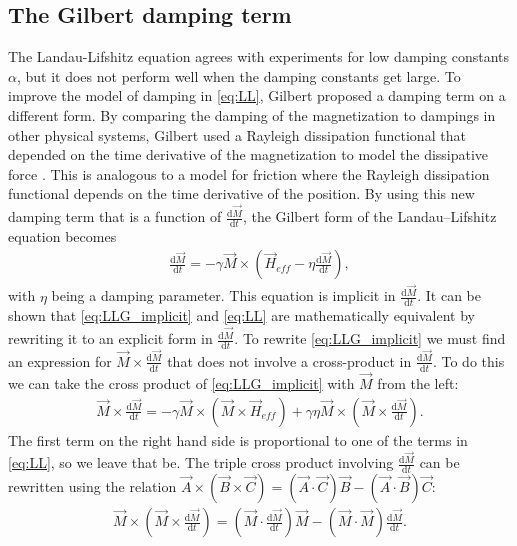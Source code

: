 \documentclass[12pt, a4paper, twoside, openright]{article}		%
\numberwithin{equation}{section}
\begin{document}
\subsection{The Gilbert damping term}
The Landau-Lifshitz equation agrees with experiments for low damping constants $\alpha$, but it does not perform well when the damping constants get large. To improve the model of damping in \eqref{eq:LL}, Gilbert proposed a damping term on a different form. By comparing the damping of the magnetization to dampings in other physical systems, Gilbert used a Rayleigh dissipation functional that depended on the time derivative of the magnetization to model the dissipative force \cite{Gilbert2004Classics}. This is analogous to a model for friction where the Rayleigh dissipation functional depends on the time derivative of the position. By using this new damping term that is a function of $\frac{\textrm{d} \vec{M}}{\textrm{d} t}$, the Gilbert form of the Landau--Lifshitz equation becomes
\begin{align}
\label{eq:LLG_implicit}
\frac{\textrm{d} \vec{M}}{\textrm{d} t} = -\gamma \vec{M} \times (\vec{H}_{eff} - \eta \frac{\textrm{d} \vec{M}}{\textrm{d} t}),
\end{align}
with $\eta$ being a damping parameter. This equation is implicit in $\frac{\textrm{d} \vec{M}}{\textrm{d} t}$. It can be shown that \eqref{eq:LLG_implicit} and \eqref{eq:LL} are mathematically equivalent by rewriting it to an explicit form in $\frac{\textrm{d} \vec{M}}{\textrm{d} t}$. To rewrite \eqref{eq:LLG_implicit} we must find an expression for $\vec{M}\times\frac{\textrm{d} \vec{M}}{\textrm{d} t}$ that does not involve a cross-product in $\frac{\textrm{d} \vec{M}}{\textrm{d} t}$. To do this we can take the cross product of \eqref{eq:LLG_implicit} with $\vec{M}$ from the left:
\begin{align}
\label{eq:mtimesdmdt}
\vec{M}\times\frac{\textrm{d} \vec{M}}{\textrm{d} t} = -\gamma \vec{M}\times(\vec{M}\times\vec{H}_{eff}) + \gamma\eta \vec{M}\times(\vec{M}\times\frac{\textrm{d} \vec{M}}{\textrm{d} t}).
\end{align}
The first term on the right hand side is proportional to one of the terms in \eqref{eq:LL}, so we leave that be. The triple cross product involving $\frac{\textrm{d} \vec{M}}{\textrm{d} t}$ can be rewritten using the relation $\vec{A}\times(\vec{B}\times\vec{C}) = (\vec{A}\cdot\vec{C})\vec{B} - (\vec{A}\cdot\vec{B})\vec{C}$:
\begin{align}
\label{eq:mag_triple_crossproduct}
\vec{M}\times(\vec{M}\times\frac{\textrm{d} \vec{M}}{\textrm{d} t}) =  (\vec{M}\cdot\frac{\textrm{d} \vec{M}}{\textrm{d} t})\vec{M} - (\vec{M}\cdot\vec{M})\frac{\textrm{d} \vec{M}}{\textrm{d} t}.
\end{align}
\end{document}
